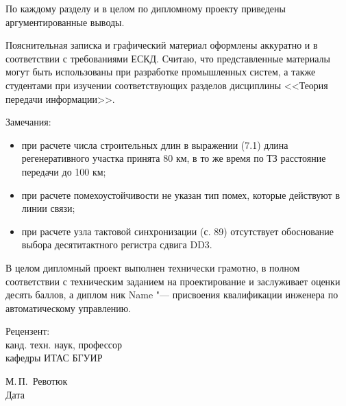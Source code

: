 \documentclass[]{lib/styles/additional-docs}
\begin{document}
\begin{singlespace}
{  По каждому разделу и в целом по дипломному проекту приведены аргументированные выводы.
  
  Пояснительная записка и графический материал оформлены аккуратно и в соответствии с требованиями ЕСКД.
  Считаю, что представленные материалы могут быть использованы при разработке промышленных систем, а также студентами при изучении соответствующих разделов дисциплины <<Теория передачи информации>>.
  
  Замечания:
  \begin{itemize}
    \item при расчете числа строительных длин в выражении (7.1) длина регенеративного участка принята 80 км, в то же время по ТЗ расстояние передачи до 100 км;
    \item при расчете помехоустойчивости не указан тип помех, которые действуют в линии связи;
    \item при расчете узла тактовой синхронизации (с. 89) отсутствует обоснование выбора десятитактного регистра сдвига DD3.
  \end{itemize}
  
  В целом дипломный проект выполнен технически грамотно, в полном соответствии с техническим заданием на проектирование и заслуживает оценки десять баллов, а диплом
  ник Name "--- присвоения квалификации инженера по автоматическому управлению.
  
    \vfill
    \noindent
    \begin{minipage}{0.4\textwidth}
      \begin{flushleft}
        Рецензент:\\
        канд. техн. наук, профессор\\
        кафедры ИТАС БГУИР
      \end{flushleft}
    \end{minipage}
    \begin{minipage}{0.58\textwidth}
      \begin{flushright}
      \underline{\hspace*{3cm}}\hspace*{0.5cm}\underline{\hspace*{2cm}} М.\,П.~Ревотюк \\
      Дата\hspace*{6.5cm}
      \end{flushright}
    \end{minipage}
  }
  
\end{singlespace}
\clearpage
\end{document}
